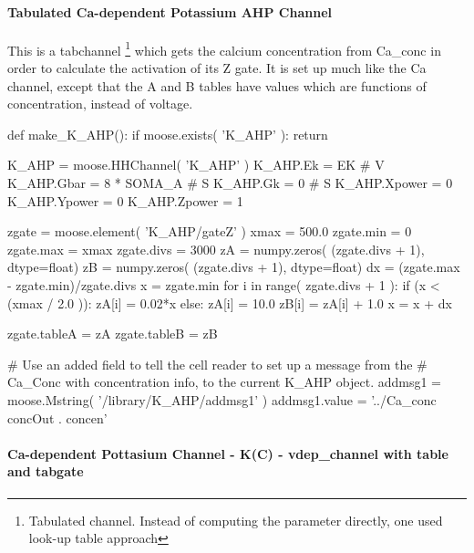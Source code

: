 \documentclass[]{article}%
\begin{document}
\paragraph{Tabulated Ca-dependent Potassium AHP Channel}

This is a {\Tt{}tabchannel\nwendquote} \footnote{Tabulated channel. Instead of computing the
parameter directly, one used look-up table approach} which gets the calcium
concentration from {\Tt{}Ca{\_}conc\nwendquote} in order to calculate the activation of its Z gate.
It is set up much like the Ca channel, except that the A and B tables have
values which are functions of concentration, instead of voltage.

\nwenddocs{}\endmoddef\nwstartdeflinemarkup{}\nwenddeflinemarkup
def make_K_AHP():
    if moose.exists( 'K_AHP' ):
        return

    K_AHP = moose.HHChannel( 'K_AHP' )
    K_AHP.Ek = EK                      # V
    K_AHP.Gbar = 8 * SOMA_A            # S
    K_AHP.Gk = 0                       # S
    K_AHP.Xpower = 0
    K_AHP.Ypower = 0
    K_AHP.Zpower = 1

    zgate = moose.element( 'K_AHP/gateZ' )
    xmax = 500.0
    zgate.min = 0
    zgate.max = xmax
    zgate.divs = 3000
    zA = numpy.zeros( (zgate.divs + 1), dtype=float)
    zB = numpy.zeros( (zgate.divs + 1), dtype=float)
    dx = (zgate.max - zgate.min)/zgate.divs
    x = zgate.min
    for i in range( zgate.divs + 1 ):
        if (x < (xmax / 2.0 )):
            zA[i] = 0.02*x
        else:
            zA[i] = 10.0
        zB[i] = zA[i] + 1.0
        x = x + dx

    zgate.tableA = zA
    zgate.tableB = zB

    # Use an added field to tell the cell reader to set up a message from the
    # Ca_Conc with concentration info, to the current K_AHP object.
    addmsg1 = moose.Mstring( '/library/K_AHP/addmsg1' )
    addmsg1.value = '../Ca_conc  concOut  . concen'

\eatline
{}\nwendcode{}\nwdocspar



\paragraph{Ca-dependent Pottasium Channel - K(C) - {\Tt{}vdep{\_}channel\nwendquote} with table
and tabgate}
\end{document}
